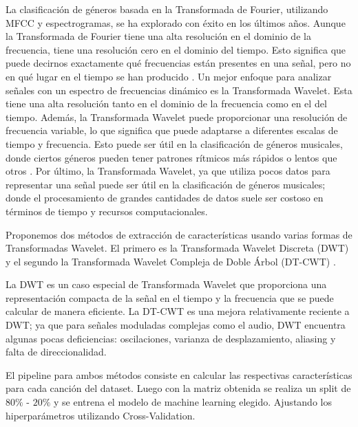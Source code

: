 \documentclass[colorinlistoftodos,twoside,twocolumn,10pt]{article} %
\begin{document}
La clasificación de géneros basada en la Transformada de Fourier, utilizando MFCC y espectrogramas, se ha explorado con éxito en los últimos años. Aunque la Transformada de Fourier tiene una alta resolución en el dominio de la frecuencia, tiene una resolución cero en el dominio del tiempo. Esto significa que puede decirnos exactamente qué frecuencias están presentes en una señal, pero no en qué lugar en el tiempo se han producido \cite{wavelet transform in machine learning}. Un mejor enfoque para analizar señales con un espectro de frecuencias dinámico es la Transformada Wavelet. Esta tiene una alta resolución tanto en el dominio de la frecuencia como en el del tiempo. Además, la Transformada Wavelet puede proporcionar una resolución de frecuencia variable, lo que significa que puede adaptarse a diferentes escalas de tiempo y frecuencia. Esto puede ser útil en la clasificación de géneros musicales, donde ciertos géneros pueden tener patrones rítmicos más rápidos o lentos que otros \cite{Musical Genre Classification Of Audio Signals}. Por último, la Transformada Wavelet, ya que utiliza pocos datos para representar una señal puede ser útil en la clasificación de géneros musicales; donde el procesamiento de grandes cantidades de datos suele ser costoso en términos de tiempo y recursos computacionales. 

	Proponemos dos métodos de extracción de características usando varias formas de Transformadas Wavelet. 
    El primero es la Transformada Wavelet Discreta (DWT) \cite{wavelet transform in machine learning} y el segundo la Transformada Wavelet Compleja de Doble Árbol (DT-CWT) \cite{DT-CWT}.
    
    La DWT es un caso especial de Transformada Wavelet que proporciona una representación compacta de la señal en el tiempo y la frecuencia que se puede calcular de manera eficiente\cite{Musical Genre Classification Of Audio Signals}. La DT-CWT es una mejora relativamente reciente a DWT; ya que para señales moduladas complejas como el audio, DWT encuentra algunas pocas deficiencias: oscilaciones, varianza de desplazamiento, aliasing y falta de direccionalidad\cite{Wavelet Transform for Music Genre Classification}. 
    
    El pipeline para ambos métodos consiste en calcular las respectivas características para cada canción del dataset. Luego con la matriz obtenida se realiza un split de $80\%$ - $20\%$ y se entrena el modelo de machine learning elegido. Ajustando los hiperparámetros utilizando Cross-Validation.
\end{document}
